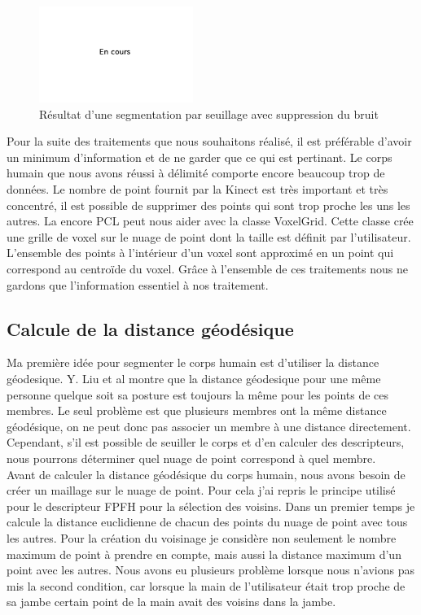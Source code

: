 \begin{figure}[!ht]
  \begin{center}
    \includegraphics[width=5cm]{image/wait.png}
    \caption{Résultat d'une segmentation par seuillage avec suppression du bruit}
    \label{fig:seuillageOutlier}
  \end{center}
\end{figure}

Pour la suite des traitements que nous souhaitons réalisé, il est préférable d'avoir un minimum d'information et de ne garder
que ce qui est pertinant. Le corps humain que nous avons réussi à délimité comporte encore beaucoup trop de données. Le nombre
de point fournit par la Kinect est très important et très concentré, il est possible de supprimer des points qui sont trop 
proche les uns les autres. La encore PCL\cite{PCL} peut nous aider avec la classe VoxelGrid. Cette classe crée une grille de
voxel sur le nuage de point dont la taille est définit par l'utilisateur. L'ensemble des points à l'intérieur d'un voxel sont 
approximé en un point qui correspond au centroïde du voxel. Grâce à l'ensemble de ces traitements nous ne gardons que l'information 
essentiel à nos traitement.

\subsection{Calcule de la distance géodésique}
Ma première idée pour segmenter le corps humain est d'utiliser la distance géodesique. Y. Liu et al\cite{GIF} montre que la distance
géodesique pour une même personne quelque soit sa posture est toujours la même pour les points de ces membres. Le seul problème 
est que plusieurs membres ont la même distance géodésique, on ne peut donc pas associer un membre à une distance directement.
Cependant, s'il est possible de seuiller le corps et d'en calculer des descripteurs, nous pourrons déterminer quel nuage de point
correspond à quel membre.\\

Avant de calculer la distance géodésique du corps humain, nous avons besoin de créer un maillage sur le nuage de point. Pour cela
j'ai repris le principe utilisé pour le descripteur FPFH\cite{FPFH} pour la sélection des voisins. Dans un premier temps je calcule
la distance euclidienne de chacun des points du nuage de point avec tous les autres. Pour la création du voisinage je considère non
seulement le nombre maximum de point à prendre en compte, mais aussi la distance maximum d'un point avec les autres. Nous avons eu
plusieurs problème lorsque nous n'avions pas mis la second condition, car lorsque la main de l'utilisateur était trop proche de sa 
jambe certain point de la main avait des voisins dans la jambe.\\

